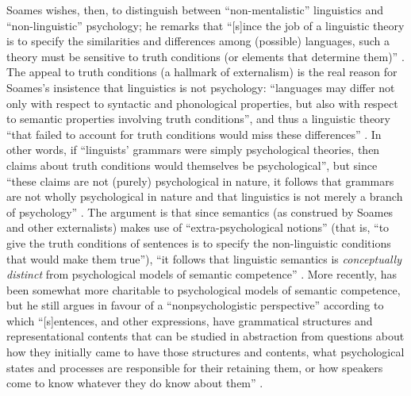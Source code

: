 Soames wishes, then, to distinguish between “non-mentalistic” linguistics and “non-linguistic” psychology; he remarks that “[s]ince the job of a linguistic theory is to specify the similarities and differences among (possible) languages, such a theory must be sensitive to truth conditions (or elements that determine them)” \citep[163]{Soames1984}. The appeal to truth conditions (a hallmark of externalism) is the real reason for Soames’s insistence that linguistics is not psychology: “languages may differ not only with respect to syntactic and phonological properties, but also with respect to semantic properties involving truth conditions”, and thus a linguistic theory “that failed to account for truth conditions would miss these differences” \citep[162]{Soames1984}. In other words, if “linguists’ grammars were simply psychological theories, then claims about truth conditions would themselves be psychological”, but since “these claims are not (purely) psychological in nature, it follows that grammars are not wholly psychological in nature and that linguistics is not merely a branch of psychology” \citep[163]{Soames1984}. The argument is that since semantics (as construed by Soames and other externalists) makes use of “extra-psychological notions” (that is, “to give the truth conditions of sentences is to specify the non-linguistic conditions that would make them true”), “it follows that linguistic semantics is \textit{conceptually distinct} from psychological models of semantic competence” \citep[163, emphasis in original]{Soames1984}. More recently, \citet{Soames2009} has been somewhat more charitable to psychological models of semantic competence, but he still argues in favour of a “nonpsychologistic perspective” according to which “[s]entences, and other expressions, have grammatical structures and representational contents that can be studied in abstraction from questions about how they initially came to have those structures and contents, what psychological states and processes are responsible for their retaining them, or how speakers come to know whatever they do know about them” \citep[1--2]{Soames2009}.

